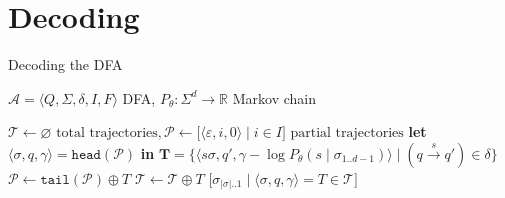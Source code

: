 \documentclass{beamer}
\begin{document}
\section{Decoding}\label{sec:error-correction}

\begin{frame}[fragile]{Decoding the DFA}
\vspace{-0.3cm}
\begin{algorithm}[H]
\caption{Steerable DFA walk}
\label{alg:adaptive}
\begin{algorithmic}[1]
\Require $\mathcal{A} = \langle Q, \Sigma, \delta, I, F\rangle$ DFA, $P_\theta: \Sigma^d \rightarrow \mathbb{R}$ Markov chain

\State $\mathcal{T} \gets \varnothing \text{ total trajectories}, \mathcal{P} \gets \big[\langle \varepsilon, i, 0\rangle \mid i \in I\big] \text{ partial trajectories}$
\Repeat
\State \textbf{let }$\langle \sigma, q, \gamma \rangle = \texttt{head}(\mathcal{P})$ \textbf{in}
\State {}$\mathbf{T} = \big\{\langle s\sigma, q', \gamma - \log P_\theta(s \mid \sigma_{1..d-1}) \rangle\mid (q\overset{s}{\rightarrow}q') \in \delta\big\}$
\State $\mathcal{P} \gets \texttt{tail}(\mathcal{P}) \oplus T$ 
{}
\State $\mathcal{T} \gets \mathcal{T} \oplus T$ 
\EndIf
\EndFor
{}
\State \Return $\big[\sigma_{|\sigma|..1} \mid \langle \sigma, q, \gamma \rangle = T \in \mathcal{T}\big]$ 
\end{algorithmic}
\end{algorithm}
\end{frame}
\end{document}
